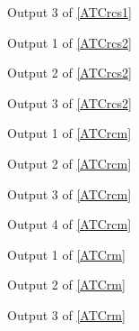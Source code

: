 \documentclass[12pt,titlepage]{article}
\begin{document}
\begin{figure}
\centering
{}
\caption{Output 3 of \cref{ATCrcs1}}
\label{output23}
\end{figure}

\clearpage

\begin{figure}
\centering
{}
\caption{Output 1 of \cref{ATCrcs2}}
\label{output31}
\end{figure}

\begin{figure}
\centering
{}
\caption{Output 2 of \cref{ATCrcs2}}
\label{output32}
\end{figure}

\begin{figure}
\centering
{}
\caption{Output 3 of \cref{ATCrcs2}}
\label{output33}
\end{figure}

\begin{figure}
\centering
{}
\caption{Output 1 of \cref{ATCrcm}}
\label{output41}
\end{figure}

\begin{figure}
\centering
{}
\caption{Output 2 of \cref{ATCrcm}}
\label{output42}
\end{figure}

\begin{figure} 
\centering
{}
\caption{Output 3 of \cref{ATCrcm}}
\label{output43}
\end{figure}

\begin{figure}
\centering
{}
\caption{Output 4 of \cref{ATCrcm}}
\label{output44}
\end{figure}


\begin{figure}
\centering
{}
\caption{Output 1 of \cref{ATCrm}}
\label{output51}
\end{figure}

\begin{figure}
\centering
{}
\caption{Output 2 of \cref{ATCrm}}
\label{output52}
\end{figure}

\begin{figure}
\centering
{}
\caption{Output 3 of \cref{ATCrm}}
\label{output53}
\end{figure}


%
%
\end{document}
